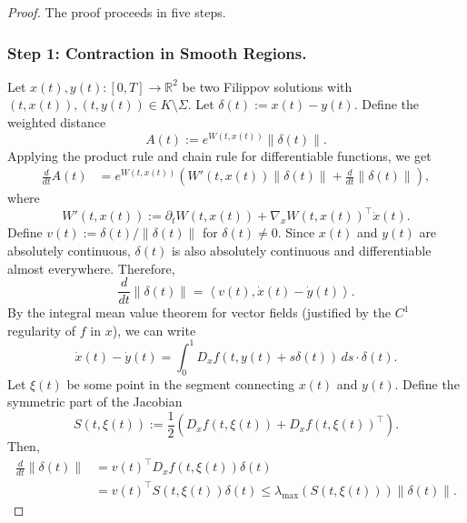 \documentclass[11pt]{article}
\begin{document}
\begin{proof}
The proof proceeds in five steps.

\subsubsection*{Step 1: Contraction in Smooth Regions.} Let $x(t), y(t): [0,T] \to \mathbb{R}^2$ be two Filippov solutions with $(t,x(t)), (t,y(t)) \in K \setminus \Sigma$. Let $\delta(t) := x(t) - y(t)$. Define the weighted distance
\begin{equation} \label{eq:weighted_distance}
	A(t) := e^{W(t,x(t))} \|\delta(t)\|.
\end{equation}
Applying the product rule and chain rule for differentiable functions, we get
\begin{align}
	\frac{d}{dt} A(t) &= e^{W(t,x(t))} \left( W'(t,x(t)) \|\delta(t)\| + \frac{d}{dt} \|\delta(t)\| \right), \label{eq:A_derivative}
\end{align}
where
\begin{equation} \label{eq:orbital_derivative}
	W'(t,x(t)) := \partial_t W(t,x(t)) + \nabla_x W(t,x(t))^\top \dot{x}(t).
\end{equation}
Define $v(t) := \delta(t)/\|\delta(t)\|$ for $\delta(t) \neq 0$. Since $x(t)$ and $y(t)$ are absolutely continuous, $\delta(t)$ is also absolutely continuous and differentiable almost everywhere. Therefore,
\begin{equation} \label{eq:delta_derivative}
	\frac{d}{dt} \|\delta(t)\| = \left\langle v(t), \dot{x}(t) - \dot{y}(t) \right\rangle.
\end{equation}
By the integral mean value theorem for vector fields (justified by the $C^1$ regularity of $f$ in $x$), we can write
\begin{equation} \label{eq:mean_value_integral}
	\dot{x}(t) - \dot{y}(t) = \int_0^1 D_x f(t, y(t) + s \delta(t)) \, ds \cdot \delta(t).
\end{equation}
Let $\xi(t)$ be some point in the segment connecting $x(t)$ and $y(t)$. Define the symmetric part of the Jacobian
\begin{equation} \label{eq:symmetric_part}
	S(t,\xi(t)) := \frac{1}{2}(D_x f(t,\xi(t)) + D_x f(t,\xi(t))^\top).
\end{equation}
Then,
\begin{align}
	\frac{d}{dt} \|\delta(t)\| &= v(t)^\top D_x f(t, \xi(t)) \delta(t) \\
	&= v(t)^\top S(t, \xi(t)) \delta(t) \leq \lambda_{\max}(S(t, \xi(t))) \|\delta(t)\|. \label{eq:delta_bound}

\end{align}
\end{proof}
\end{document}
